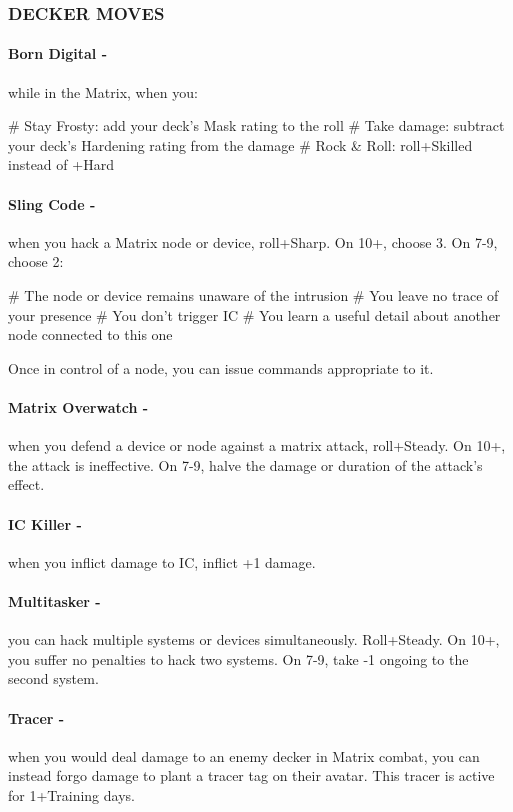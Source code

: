 \subsubsection{DECKER MOVES}
\paragraph{Born Digital -} while in the Matrix, when you:
    \begin{easylist}
        # Stay Frosty: add your deck’s Mask rating to the roll
        # Take damage: subtract your deck’s Hardening rating from the damage
        # Rock \& Roll: roll+Skilled instead of +Hard
    \end{easylist}

\paragraph{Sling Code -} when you hack a Matrix node or device, roll+Sharp. On 10+, choose 3. On 7-9, choose 2:
    \begin{easylist}
        # The node or device remains unaware of the intrusion
        # You leave no trace of your presence
        # You don’t trigger IC
        # You learn a useful detail about another node connected to this one
    \end{easylist}
Once in control of a node, you can issue commands appropriate to it.

\paragraph{Matrix Overwatch -} when you defend a device or node against a matrix attack, roll+Steady. On 10+, the attack is ineffective. On 7-9, halve the damage or duration of the attack’s effect.

\paragraph{IC Killer -} when you inflict damage to IC, inflict +1 damage.

\paragraph{Multitasker -} you can hack multiple systems or devices simultaneously. Roll+Steady. On 10+, you suffer no penalties to hack two systems. On 7-9, take -1 ongoing to the second system.

\paragraph{Tracer -} when you would deal damage to an enemy decker in Matrix combat, you can instead forgo damage to plant a tracer tag on their avatar. This tracer is active for 1+Training days.



